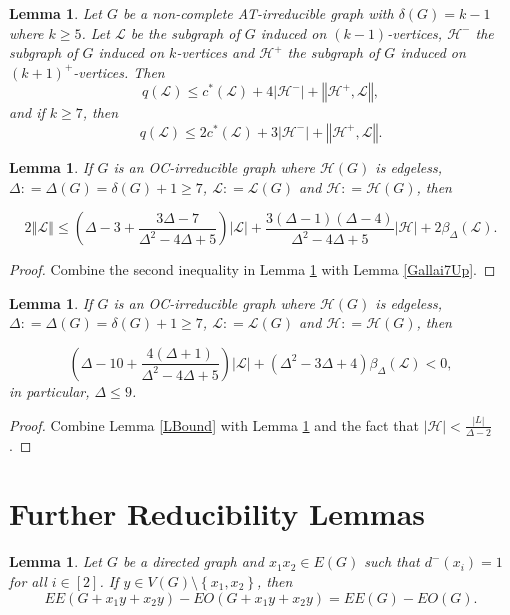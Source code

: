\documentclass[12pt]{article}
\theoremstyle{plain}
\newtheorem{lem}[thm]{Lemma}
\theoremstyle{definition}
\theoremstyle{remark}
\newcommand{\fancy}[1]{\mathcal{#1}}
\renewcommand{\L}{\fancy{L}}
\newcommand{\HH}{\fancy{H}}
\newcommand{\set}[1]{\left\{ #1 \right\}}
\newcommand{\card}[1]{\left|#1\right|}
\newcommand{\size}[1]{\left\Vert#1\right\Vert}
\newcommand{\irange}[1]{\left[#1\right]}
\newcommand{\parens}[1]{\left( #1 \right)}
\newcommand{\DefinedAs}{\mathrel{\mathop:}=}
\begin{document}
\begin{lem}\label{qLemma}
	Let $G$ be a non-complete AT-irreducible graph with $\delta(G) = k-1$ where $k \ge 5$.  Let $\L$ be the subgraph of $G$ induced on $(k-1)$-vertices, $\HH^-$ the subgraph of $G$ induced on $k$-vertices and 
	$\HH^+$ the subgraph of $G$ induced on $(k+1)^+$-vertices.  Then
	\[q(\L) \le c^*(\L) + 4\card{\HH^-} + \size{\HH^+, \L},\] and if $k \ge 7$, then
	\[q(\L) \le 2c^*(\L) + 3\card{\HH^-} + \size{\HH^+, \L}.\]
\end{lem}

\begin{lem}\label{QuaBound}
If $G$ is an OC-irreducible graph where $\HH(G)$ is edgeless, $\Delta \DefinedAs \Delta(G) = \delta(G) + 1 \ge 7$, $\L\DefinedAs\L(G)$ and $\HH \DefinedAs \HH(G)$, then

\[2\size{\L} \le \parens{\Delta-3 + \frac{3\Delta-7}{\Delta^2-4\Delta+5}}\card{\L} + \frac{3(\Delta-1)(\Delta-4)}{\Delta^2-4\Delta+5}\card{\HH} +  2\beta_{\Delta}(\L).\]
\end{lem}
\begin{proof}
Combine the second inequality in Lemma \ref{qLemma} with Lemma \ref{Gallai7Up}.
\end{proof}

\begin{lem}
If $G$ is an OC-irreducible graph where $\HH(G)$ is edgeless, $\Delta \DefinedAs \Delta(G) = \delta(G) + 1 \ge 7$, $\L\DefinedAs\L(G)$ and $\HH \DefinedAs \HH(G)$, then

\[\parens{\Delta-10 + \frac{4(\Delta+1)}{\Delta^2-4\Delta+5}}\card{\L} + \parens{\Delta^2-3\Delta+4}\beta_{\Delta}(\L)< 0,\]
in particular, $\Delta \le 9$.
\end{lem}
\begin{proof}
Combine Lemma \ref{LBound} with Lemma \ref{QuaBound} and the fact that $\card{\HH} < \frac{\card{L}}{\Delta-2}$.
\end{proof}

\section{Further Reducibility Lemmas}
\begin{lem}
Let $G$ be a directed graph and $x_1x_2 \in E(G)$ such that $d^-(x_i) = 1$ for all $i\in \irange{2}$.  If $y \in V(G) \setminus \set{x_1,x_2}$, then
\[EE(G + x_1y + x_2y)-EO(G + x_1y + x_2y) = EE(G) - EO(G).\]
\end{lem}
\end{document}
